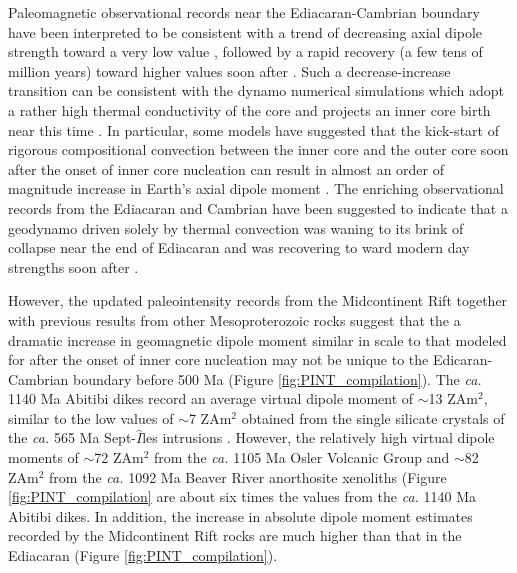 \documentclass[9pt,twocolumn,twoside,lineno]{pnas-new}
\begin{document}
Paleomagnetic observational records near the Ediacaran-Cambrian boundary have been interpreted to be consistent with a trend of decreasing axial dipole strength toward a very low value \cite{Lloyd2021a, Bono2019a}, followed by a rapid recovery (a few tens of million years) toward higher values soon after \cite{Thallner2021a}. Such a decrease-increase transition can be consistent with the dynamo numerical simulations which adopt a rather high thermal conductivity of the core and projects an inner core birth near this time \cite{Gomi2013a, Davies2015a, Labrosse2015a, Ohta2016a}. In particular, some models have suggested that the kick-start of rigorous compositional convection between the inner core and the outer core soon after the onset of inner core nucleation can result in almost an order of magnitude increase in Earth's axial dipole moment \cite[e.g.]{Davies2021a}. The enriching observational records from the Ediacaran and Cambrian have been suggested to indicate that a geodynamo driven solely by thermal convection was waning to its brink of collapse near the end of Ediacaran \cite{Bono2019a, Thallner2021b} and was recovering to ward modern day strengths soon after \cite{Thallner2021a}.

However, the updated paleointensity records from the Midcontinent Rift together with previous results from other Mesoproterozoic rocks suggest that the a dramatic increase in geomagnetic dipole moment similar in scale to that modeled for after the onset of inner core nucleation may not be unique to the Edicaran-Cambrian boundary before 500 Ma (Figure \ref{fig:PINT_compilation}). The \textit{ca.} 1140 Ma Abitibi dikes \cite{Macouin2003a} record an average virtual dipole moment of $\sim$13 ZAm$^2$, similar to the low values of $\sim$7 ZAm$^2$ obtained from the single silicate crystals of the \textit{ca.} 565 Ma Sept-$\hat{I}$les intrusions \cite{Bono2019a}. However, the relatively high virtual dipole moments of $\sim$72 ZAm$^2$ from the \textit{ca.} 1105 Ma Osler Volcanic Group \cite{Sprain2018a} and $\sim$82 ZAm$^2$ from the \textit{ca.} 1092 Ma Beaver River anorthosite xenoliths (Figure \ref{fig:PINT_compilation} are about six times the values from the \textit{ca.} 1140 Ma Abitibi dikes. In addition, the increase in absolute dipole moment estimates recorded by the Midcontinent Rift rocks are much higher than that in the Ediacaran (Figure \ref{fig:PINT_compilation}). 
\end{document}

